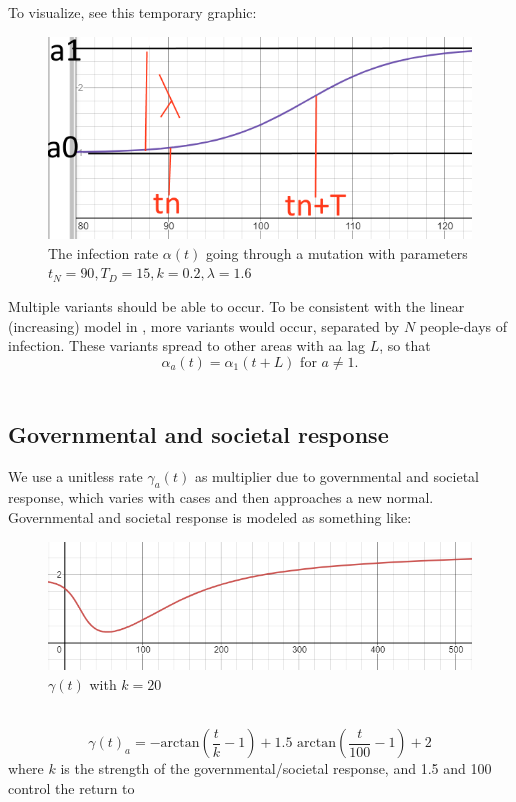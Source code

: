 \documentclass{article}
\begin{document}
    
    To visualize, see this temporary graphic:\\
    \begin{figure}[!ht]
        \centering
        \includegraphics[scale=.5]{alpha equation 2.png}
        \caption{The infection rate $\alpha(t)$ going through a mutation with parameters $t_N = 90, T_D=15, k=0.2, \lambda = 1.6$}
        \label{fig:mutation}
    \end{figure}
    Multiple variants should be able to occur. To be consistent with the linear (increasing) model in \cite{m2}, more variants would occur, separated by $N$ people-days of infection. These variants spread to other areas with aa lag $L$, so that \begin{equation}
        \alpha_a(t) = \alpha_1(t+L) \text{   for }a \neq 1\text{}.\end{equation}\\
    \subsection{Governmental and societal response} We use a unitless rate $\gamma_a(t)$ as multiplier due to governmental and societal response, which varies with cases and then approaches a new normal.\\
    Governmental and societal response is modeled as something like:
    \begin{figure}[!ht]
        \centering
        \includegraphics[scale=.6]{gamma.png}
        \caption{$\gamma(t)$ with $k=20$}
        \label{fig:gamma}
    \end{figure}\\
        \begin{equation}
        \gamma(t)_a = -\text{arctan}\left(\frac{t}{k}-1\right)+1.5\text{ arctan}\left(\frac{t}{100}-1\right)+2
    \end{equation}
    where $k$ is the strength of the governmental/societal response, and 1.5 and 100 control the return to \\
\end{document}
